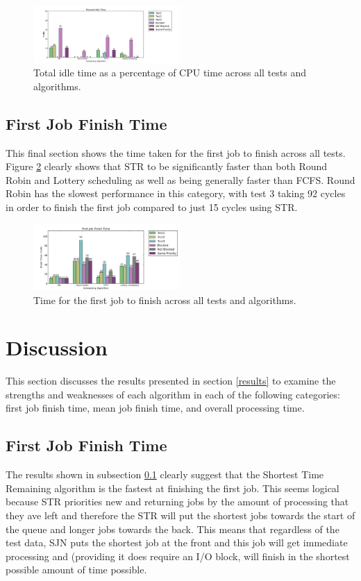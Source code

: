 \documentclass{acm_proc_article-sp}
\begin{document}
\begin{figure}[H]
\centering
\includegraphics[width=0.5\textwidth]{idle_time_per.png}
\caption{Total idle time as a percentage of CPU time across all tests and algorithms.}
\label{fig:idle-time}
\end{figure}

\subsection{First Job Finish Time}
\label{results-fstjob-time}
This final section shows the time taken for the first job to finish across all tests. Figure \ref{fig:fstjob-time} clearly shows that STR to be significantly faster than both Round Robin and Lottery scheduling as well as being generally faster than FCFS. Round Robin has the slowest performance in this category, with test 3 taking 92 cycles in order to finish the first job compared to just 15 cycles using STR.

\begin{figure}[H]
\centering
\includegraphics[width=0.5\textwidth]{fstjob_time.png}
\caption{Time for the first job to finish across all tests and algorithms.}
\label{fig:fstjob-time}
\end{figure}

\section{Discussion}
This section discusses the results presented in section \ref{results} to examine the strengths and weaknesses of each algorithm in each of the following categories: first job finish time, mean job finish time, and overall processing time.

\subsection{First Job Finish Time}
The results shown in subsection \ref{results-fstjob-time} clearly suggest that the Shortest Time Remaining algorithm is the fastest at finishing the first job. This seems logical because STR priorities new and returning jobs by the amount of processing that they ave left and therefore the STR will put the shortest jobs towards the start of the queue and longer jobs towards the back. This means that regardless of the test data, SJN puts the shortest job at the front and this job will get immediate processing and (providing it does require an I/O block, will finish in the shortest possible amount of time possible.
\end{document}
